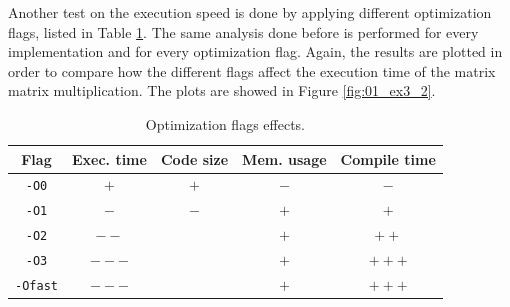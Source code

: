 \documentclass[a4paper]{article}
\begin{document}
Another test on the execution speed is done by applying different optimization flags, listed in Table \ref{tab:01_ex3_1}. The same analysis done before is performed for every implementation and for every optimization flag. Again, the results are plotted in order to compare how the different flags affect the execution time of the matrix matrix multiplication. The plots are showed in Figure \ref{fig:01_ex3_2}.

\begin{table}[!h]
	\centering
	\begin{tabular}{ccccc}
		\toprule
		Flag	&	Exec. time	&	Code size	&	Mem. usage	&	Compile time	\\
		\midrule
		\texttt{-O0}	&	\( + \) 	&	\( + \)	&	\( - \)	&	\( - \)  	\\
		\texttt{-O1}	&	\( - \) 	&	\( - \)	&	\( + \)	&	\( + \)  	\\
		\texttt{-O2}	&	\( -- \)	&	       	&	\( + \)	&	\( ++ \) 	\\
		\texttt{-O3}	&	\( --- \)	&	       	&	\( + \)	&	\( +++ \)	\\
		\texttt{-Ofast}	&	\( --- \)	&	       	&	\( + \)	&	\( +++ \)	\\
		\bottomrule
	\end{tabular}
	\caption{Optimization flags effects.}
	\label{tab:01_ex3_1}
\end{table}
\end{document}
